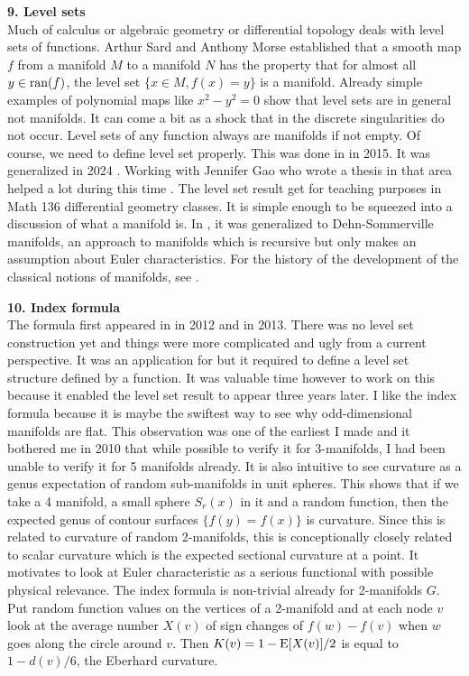 \documentclass[12pt]{amsart}
\begin{document}
{\bf 9. Level sets} \\

Much of calculus or algebraic geometry or differential topology deals with 
level sets of functions. Arthur Sard \cite{Sard1942,Sard1958} and Anthony Morse 
\cite{Morse1939} established that
a smooth map $f$ from a manifold $M$ to a manifold $N$ has the property that 
for almost all $y \in {\rm ran}(f)$, the level set $\{ x \in M, f(x) = y \}$ 
is a manifold. Already simple examples of polynomial maps like $x^2-y^2=0$ show
that level sets are in general not manifolds. It can come a bit as a shock
that in the discrete singularities do not occur. Level sets of any function
always are manifolds if not empty. Of course, we need to define level set properly.
This was done in \cite{KnillSard} in 2015. 
It was generalized in 2024 \cite{ManifoldsPartitions}. Working with Jennifer Gao
who wrote a thesis in that area helped a lot during this time \cite{Gao2024}. 
The level set result get for teaching purposes in Math 136
differential geometry classes. It is simple enough to be squeezed into a discussion
of what a manifold is. 
In \cite{DehnSommervilleManifolds}, it was generalized to Dehn-Sommerville 
manifolds, an approach to manifolds which is recursive but only makes an 
assumption about Euler characteristics. 
For the history of the development of the classical notions of manifolds, see
\cite{HistoryTopology,Scholz,Manolescu}.


{\bf 10. Index formula} \\

The formula first appeared in \cite{indexformula} in 2012 and \cite{eveneuler} in 2013.
There was no level set construction yet and things were more complicated and ugly from
a current perspective. It was an application for \cite{indexexpectation} but it required
to define a level set structure defined by a function. It was valuable time however to 
work on this because it enabled the level set result to appear three years later. 
I like the index formula because it
is maybe the swiftest way to see why odd-dimensional manifolds are flat. This observation
was one of the earliest I made and it bothered me in 2010 that while possible to verify it
for 3-manifolds, I had been unable to verify it for 5 manifolds already. 
It is also intuitive to see curvature as a genus expectation of random sub-manifolds
in unit spheres. This shows that if we take a 4 manifold, a small sphere $S_r(x)$ in it and
a random function, then the expected genus of contour surfaces  $\{ f(y)=f(x)\}$ is
curvature. Since this is related to curvature of random 2-manifolds, this is
conceptionally closely related to scalar curvature which is the expected sectional 
curvature at a point. It motivates to look at Euler characteristic as a serious
functional with possible physical relevance. 
The index formula is non-trivial already for 2-manifolds $G$. Put random function values
on the vertices of a 2-manifold and at each node $v$ look at the average number $X(v)$
of sign changes of $f(w)-f(v)$ when $w$ goes along the circle around $v$. Then
$K(v) = 1-{\rm E}[X(v)]/2$ is equal to $1-d(v)/6$, the Eberhard curvature.  \\
\end{document}
